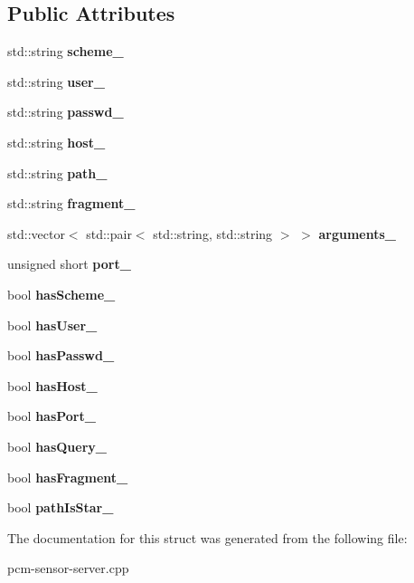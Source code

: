 \subsection*{Public Attributes}
\begin{DoxyCompactItemize}
\item 
\mbox{\label{structURL_accf570b12bb2af805f92505223d1f57d}} 
std\+::string {\bfseries scheme\+\_\+}
\item 
\mbox{\label{structURL_ab1bed3b8989b96b7bc9a27a58dcf4894}} 
std\+::string {\bfseries user\+\_\+}
\item 
\mbox{\label{structURL_aaafe3d053c51992f2e86cae9556b3742}} 
std\+::string {\bfseries passwd\+\_\+}
\item 
\mbox{\label{structURL_aa0b62499f33f71b011cb1e0a41e7b869}} 
std\+::string {\bfseries host\+\_\+}
\item 
\mbox{\label{structURL_a5bcad7bcc133958e4526df9f57f6af28}} 
std\+::string {\bfseries path\+\_\+}
\item 
\mbox{\label{structURL_abcd694fc8408d6382f67becbab9b35c6}} 
std\+::string {\bfseries fragment\+\_\+}
\item 
\mbox{\label{structURL_ac3424077ca004d85ea2e926f8f0c76cd}} 
std\+::vector$<$ std\+::pair$<$ std\+::string, std\+::string $>$ $>$ {\bfseries arguments\+\_\+}
\item 
\mbox{\label{structURL_a8229da9c20432807cb01da5bc00b8548}} 
unsigned short {\bfseries port\+\_\+}
\item 
\mbox{\label{structURL_ad55d71870d85dccc61118bea1edbf1e7}} 
bool {\bfseries has\+Scheme\+\_\+}
\item 
\mbox{\label{structURL_a5b4c27b1d9f5eebdb5b6636984902c59}} 
bool {\bfseries has\+User\+\_\+}
\item 
\mbox{\label{structURL_aad6b89b4359075dca57e10cf8318aae2}} 
bool {\bfseries has\+Passwd\+\_\+}
\item 
\mbox{\label{structURL_a6bfc128bf3ce0a304c7f7c2ad8ab1671}} 
bool {\bfseries has\+Host\+\_\+}
\item 
\mbox{\label{structURL_a0106abc21399207445a595b28fed7a44}} 
bool {\bfseries has\+Port\+\_\+}
\item 
\mbox{\label{structURL_ae6dc8c5ec4c253e7504bd7d869d0308f}} 
bool {\bfseries has\+Query\+\_\+}
\item 
\mbox{\label{structURL_a0e8d4ce6ba065b52f66887d6bfa5a45e}} 
bool {\bfseries has\+Fragment\+\_\+}
\item 
\mbox{\label{structURL_a3e9843e29f925f7afb3128aaba558776}} 
bool {\bfseries path\+Is\+Star\+\_\+}
\end{DoxyCompactItemize}


The documentation for this struct was generated from the following file\+:\begin{DoxyCompactItemize}
\item 
pcm-\/sensor-\/server.\+cpp\end{DoxyCompactItemize}
